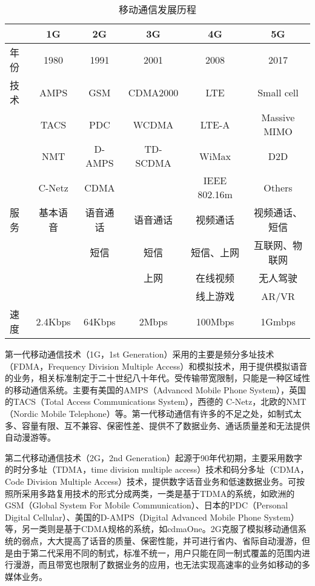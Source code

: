 \documentclass[figurelist,tablelist,algorithmlist,nomlist,masters]{seuthesix}
\begin{document}
	\begin{table}[tbp]
	\caption{
		\textsc{移动通信发展历程}
		\label{tab1_1_1}
	}
	\begin{center}
		\begin{tabular*}{15cm}{@{\extracolsep{\fill}}lccccc}
			\hline\hline
						&1G			& 2G		& 3G		& 4G			& 5G			\\ \hline
			年份		& 1980 		& 1991 		& 2001 		& 2008			& 2017			\\ \hline
			技术		& AMPS 		& GSM 		& CDMA2000 	& LTE			& Small cell	\\ 
						& TACS 		& PDC 		& WCDMA 	& LTE-A			& Massive MIMO	\\
						& NMT 		& D-AMPS 	& TD-SCDMA 	& WiMax			& D2D			\\
						& C-Netz 	& CDMA		&   		& IEEE 802.16m	& Others		\\ \hline
			服务		& 基本语音 	& 语音通话 	& 语音通话 	& 视频通话		& 视频通话、短信\\ 
						& 		 	& 短信 		& 短信 		& 短信、上网	& 互联网、物联网\\ 
						& 		 	&   		& 上网  	& 在线视频		& 无人驾驶		\\ 
						& 		 	&   		& 		 	& 线上游戏		& AR/VR			\\ \hline
			速度		& 2.4Kbps 	& 64Kbps	& 2Mbps 	& 100Mbps		& 1Gmbps		\\ \hline \hline
		\end{tabular*}
	\end{center}
	\end{table}
	
	第一代移动通信技术（1G，1st Generation）采用的主要是频分多址技术（FDMA，Frequency Division Multiple Access）和模拟技术，用于提供模拟语音的业务，相关标准制定于二十世纪八十年代。受传输带宽限制，只能是一种区域性的移动通信系统。主要有美国的AMPS（Advanced Mobile Phone System），英国的TACS（Total Access Communications System），西德的 C-Netz，北欧的NMT（Nordic Mobile Telephone）等。第一代移动通信有许多的不足之处，如制式太多、容量有限、互不兼容、保密性差、提供不了数据业务、通话质量差和无法提供自动漫游等。
	
	
	第二代移动通信技术（2G，2nd Generation）起源于90年代初期，主要采用数字的时分多址（TDMA，time division multiple access）技术和码分多址（CDMA，Code Division Multiple Access）技术，提供数字话音业务和低速数据业务。可按照所采用多路复用技术的形式分成两类，一类是基于TDMA的系统，如欧洲的GSM（Global System For Mobile Communication）、日本的PDC（Personal Digital Cellular）、美国的D-AMPS（Digital Advanced Mobile Phone System）等，另一类则是基于CDMA规格的系统，如cdmaOne。2G克服了模拟移动通信系统的弱点，大大提高了话音的质量、保密性能，并可进行省内、省际自动漫游，但是由于第二代采用不同的制式，标准不统一，用户只能在同一制式覆盖的范围内进行漫游，而且带宽也限制了数据业务的应用，也无法实现高速率的业务如移动的多媒体业务。
	
\end{document}
